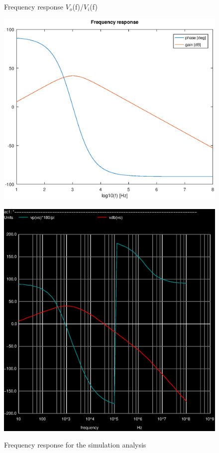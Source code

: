 \begin{figure}[!ht] \centering
\caption{Frequency response $V_o$(f)/$V_i$(f)}
\includegraphics[width=0.4\linewidth]{theory.eps}
\caption{Frequency response for the simulation analysis}
\includegraphics[width=0.4\linewidth]{simulation.eps}
\label{fig:theoretical}
\end{figure}
